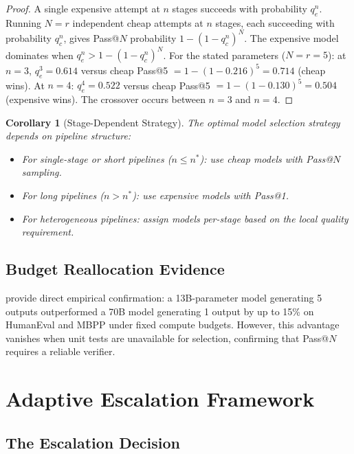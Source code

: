 \documentclass[11pt, a4paper, copyright]{googledeepmind}
\newtheorem{corollary}{Corollary}[section]
\begin{document}
\begin{proof}
A single expensive attempt at $n$ stages succeeds with probability $q_e^n$. Running $N = r$ independent cheap attempts at $n$ stages, each succeeding with probability $q_c^n$, gives Pass@$N$ probability $1 - (1 - q_c^n)^N$. The expensive model dominates when $q_e^n > 1 - (1 - q_c^n)^N$. For the stated parameters ($N = r = 5$): at $n = 3$, $q_e^3 = 0.614$ versus cheap Pass@5 $= 1 - (1 - 0.216)^5 = 0.714$ (cheap wins). At $n = 4$: $q_e^4 = 0.522$ versus cheap Pass@5 $= 1 - (1 - 0.130)^5 = 0.504$ (expensive wins). The crossover occurs between $n = 3$ and $n = 4$.
\end{proof}

\begin{corollary}[Stage-Dependent Strategy]
\label{cor:strategy}
The optimal model selection strategy depends on pipeline structure:
\begin{itemize}
\item For single-stage or short pipelines ($n \leq n^*$): use cheap models with Pass@$N$ sampling.
\item For long pipelines ($n > n^*$): use expensive models with Pass@1.
\item For heterogeneous pipelines: assign models per-stage based on the local quality requirement.
\end{itemize}
\end{corollary}

\subsection{Budget Reallocation Evidence}

\citet{hassid2024budget} provide direct empirical confirmation: a 13B-parameter model generating 5 outputs outperformed a 70B model generating 1 output by up to 15\% on HumanEval and MBPP under fixed compute budgets. However, this advantage vanishes when unit tests are unavailable for selection, confirming that Pass@$N$ requires a reliable verifier.


\section{Adaptive Escalation Framework}
\label{sec:escalation}

\subsection{The Escalation Decision}
\end{document}
